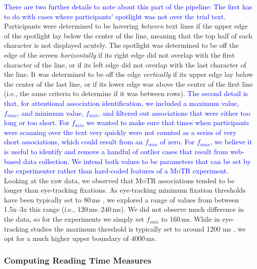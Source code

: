 \documentclass[12pt]{article}
\newcommand{\motr}{\textsc{MoTR}\xspace}
\newcommand{\change}[1]{\textcolor{blue}{#1}}
\begin{document}
\change{There are two further details to note about this part of the pipeline: The first has to do with cases where participants' spotlight was not over the trial text.} Participants were determined to be hovering \emph{between} text lines if the upper edge of the spotlight lay below the center of the line, meaning that the top half of each character is not displayed acutely. The spotlight was determined to be off the edge of the screen \emph{horizontally} if its right edge did not overlap with the first character of the line, or if its left edge did not overlap with the last character of the line. It was determined to be off the edge \emph{vertically} if its upper edge lay below the center of the last line, or if its lower edge was above the center of the first line (i.e., the same criteria to determine if it was between rows). \change{The second detail is that, for attentional association identification, we included a maximum value, $f_{max}$, and minimum value, $f_{min}$, and filtered out associations that were either too long or too short. For $f_{min}$ we wanted to make sure that times when participants were scanning over the text very quickly were not counted as a series of very short associations, which could result from an $f_{min}$ of zero. For $f_{max}$, we believe it is useful to identify and remove a handful of outlier cases that result from web-based data collection. We intend both values to be parameters that can be set by the experimenter rather than hard-coded features of a \motr experiment.} Looking at the raw data, we observed that \motr associations tended to be longer than eye-tracking fixations. As eye-tracking minimum fixation thresholds have been typically set to 80\,ms \citep{luke2018provo, slattery2019sweep, prasse2020biometric}, we explored a range of values from between 1.5x--3x this range (i.e., 120\,ms--240\,ms). We did not observe much difference in the data, so for the experiments we simply set $f_{min}$ to 160\,ms. While in eye-tracking studies the maximum threshold is typically set to around 1200 ms \citep{luke2018provo, luke2016content, prasse2020biometric, slattery2019sweep}, we opt for a much higher upper boundary of 4000\,ms.

\subsubsection{Computing Reading Time Measures}
\end{document}
